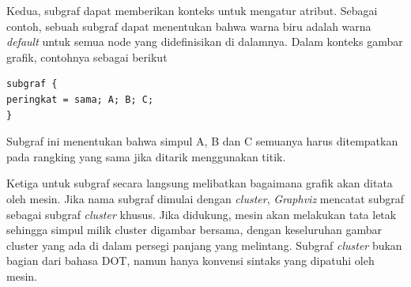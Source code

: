 Kedua, subgraf dapat memberikan konteks untuk mengatur atribut. Sebagai contoh, sebuah subgraf dapat menentukan bahwa warna biru adalah warna \textit{default} untuk semua node yang didefinisikan di dalamnya. Dalam konteks gambar grafik, contohnya sebagai berikut

\begin{lstlisting}
subgraf {
peringkat = sama; A; B; C;
}
\end{lstlisting}

Subgraf ini menentukan bahwa simpul A, B dan C semuanya harus ditempatkan pada rangking yang sama jika ditarik menggunakan titik.

Ketiga untuk subgraf secara langsung melibatkan bagaimana grafik akan ditata oleh mesin. Jika nama subgraf dimulai dengan \textit{cluster}, \textit{Graphviz} mencatat subgraf sebagai subgraf \textit{cluster} khusus. Jika didukung, mesin akan melakukan tata letak sehingga simpul milik cluster digambar bersama, dengan keseluruhan gambar cluster yang ada di dalam persegi panjang yang melintang. Subgraf \textit{cluster} bukan bagian dari bahasa DOT, namun hanya konvensi sintaks yang dipatuhi oleh mesin.  


